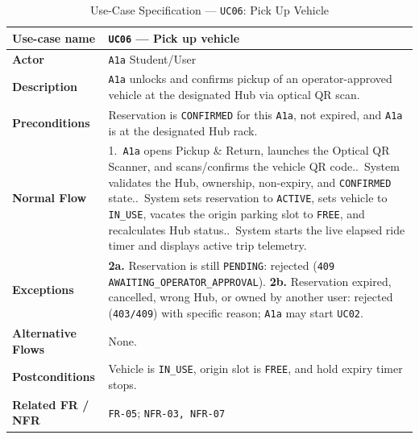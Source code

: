\begin{table}[H]
  \centering
  \singlespacing\footnotesize
  \caption{Use-Case Specification --- \texttt{UC06}: Pick Up Vehicle}
  \label{tab:uc06}
  \renewcommand{\arraystretch}{1.13}
  \begin{tabularx}{\textwidth}{|L{2.9cm}|Y|}
    \hline
    \textbf{Use-case name} & \textbf{\texttt{UC06} --- Pick up vehicle} \\
    \hline
    \textbf{Actor} & \texttt{A1a} Student/User \\
    \hline
    \textbf{Description} & \texttt{A1a} unlocks and confirms pickup of an operator-approved vehicle at the designated Hub via optical QR scan. \\
    \hline
    \textbf{Preconditions} & Reservation is \texttt{CONFIRMED} for this \texttt{A1a}, not expired, and \texttt{A1a} is at the designated Hub rack. \\
    \hline
    \textbf{Normal Flow} & 1.\ \texttt{A1a} opens Pickup \& Return, launches the Optical QR Scanner, and scans/confirms the vehicle QR code..\ System validates the Hub, ownership, non-expiry, and \texttt{CONFIRMED} state..\ System sets reservation to \texttt{ACTIVE}, sets vehicle to \texttt{IN\_\allowbreak USE}, vacates the origin parking slot to \texttt{FREE}, and recalculates Hub status..\ System starts the live elapsed ride timer and displays active trip telemetry. \\
    \hline
    \textbf{Exceptions} & \textbf{2a.} Reservation is still \texttt{PENDING}: rejected (\texttt{409 AWAITING\_\allowbreak OPERATOR\_\allowbreak APPROVAL}).\newline
    \textbf{2b.} Reservation expired, cancelled, wrong Hub, or owned by another user: rejected (\texttt{403/409}) with specific reason; \texttt{A1a} may start \texttt{UC02}. \\
    \hline
    \textbf{Alternative Flows} & None. \\
    \hline
    \textbf{Postconditions} & Vehicle is \texttt{IN\_\allowbreak USE}, origin slot is \texttt{FREE}, and hold expiry timer stops. \\
    \hline
    \textbf{Related FR / NFR} & \texttt{FR-05}; \texttt{NFR-03, NFR-07} \\
    \hline
  \end{tabularx}
\end{table}


